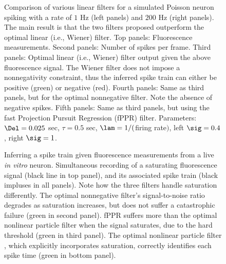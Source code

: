 \documentclass[12pt]{article}
\begin{document}
\begin{figure}
\caption{Comparison of various linear filters for a simulated Poisson neuron spiking with a rate of $1$ Hz (left panels) and $200$ Hz (right panels). The main result is that the two filters proposed outperform the optimal linear (i.e., Wiener) filter. Top panels: Fluorescence measurements.  Second panels: Number of spikes per frame.  Third panels: Optimal linear (i.e., Wiener) filter output given the above fluorescence signal.  The Wiener filter does not impose a nonnegativity constraint, thus the inferred spike train can either be positive (green) or negative (red).  Fourth panels: Same as third panels, but for the optimal nonnegative filter. Note the absence of negative spikes.  Fifth panels: Same as third panels, but using the fast Projection Pursuit Regression (fPPR) filter. Parameters: $\Del=0.025$ sec, $\tau=0.5$ sec, $\lam=1/($firing rate$)$, left  $\sig=0.4$, right $\sig=1$.} \label{fig:comp}
\end{figure}

\begin{figure}[!h]
\caption{Inferring a spike train given fluorescence measurements from a live \emph{in vitro} neuron.  Simultaneous recording of a saturating fluorescence signal (black line in top panel), and its associated spike train (black impluses in all panels).  Note how the three filters handle saturation differently. The optimal nonnegative filter's signal-to-noise ratio degrades as saturation increases, but does not suffer a catastrophic failure (green in second panel). fPPR suffers more than the optimal nonlinear particle filter when the signal saturates, due to the hard threshold (green in third panel). The optimal nonlinear particle filter \cite{BJ08}, which explicitly incorporates saturation, correctly identifies each spike time (green in bottom panel).} \label{fig:real}
\end{figure}
\end{document}
